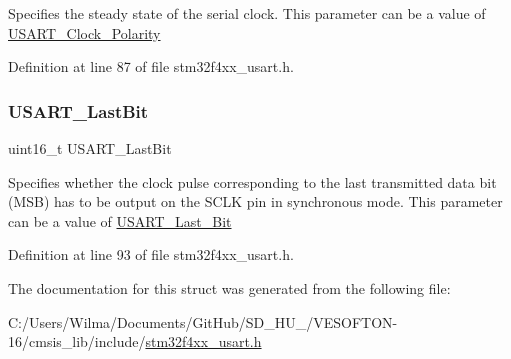 Specifies the steady state of the serial clock. This parameter can be a value of \hyperlink{group___u_s_a_r_t___clock___polarity}{U\+S\+A\+R\+T\+\_\+\+Clock\+\_\+\+Polarity} 

Definition at line 87 of file stm32f4xx\+\_\+usart.\+h.

\mbox{\label{struct_u_s_a_r_t___clock_init_type_def_a998735e29b6f77d3e993d8d34c74cbca}} 
\subsubsection{\texorpdfstring{U\+S\+A\+R\+T\+\_\+\+Last\+Bit}{USART\_LastBit}}
{\footnotesize\ttfamily uint16\+\_\+t U\+S\+A\+R\+T\+\_\+\+Last\+Bit}

Specifies whether the clock pulse corresponding to the last transmitted data bit (M\+SB) has to be output on the S\+C\+LK pin in synchronous mode. This parameter can be a value of \hyperlink{group___u_s_a_r_t___last___bit}{U\+S\+A\+R\+T\+\_\+\+Last\+\_\+\+Bit} 

Definition at line 93 of file stm32f4xx\+\_\+usart.\+h.



The documentation for this struct was generated from the following file\+:\begin{DoxyCompactItemize}
\item 
C\+:/\+Users/\+Wilma/\+Documents/\+Git\+Hub/\+S\+D\+\_\+\+H\+U\+\_/\+V\+E\+S\+O\+F\+T\+O\+N-\/16/cmsis\+\_\+lib/include/\hyperlink{stm32f4xx__usart_8h}{stm32f4xx\+\_\+usart.\+h}\end{DoxyCompactItemize}
